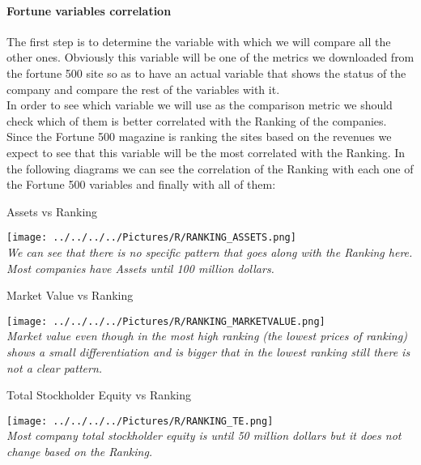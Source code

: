 \documentclass{article}
\begin{document}
\paragraph{Fortune variables correlation}
The first step is to determine the variable with which we will compare all the other ones. Obviously this variable will be one of the metrics we downloaded from the fortune 500 site so as to have an actual variable that shows the status of the company and compare the rest of the variables with it.\\
In order to see which variable we will use as the comparison metric we should check which of them is better correlated with the Ranking of the companies. Since the Fortune 500 magazine is ranking the sites based on the revenues we expect to see that this variable will be the most correlated with the Ranking. In the following diagrams we can see the correlation of the Ranking with each one of the Fortune 500 variables and finally with all of them:\\
\begin{table}[H]
\centering
\caption{Assets vs Ranking}
\begin{center}
\texttt{[image: ../../../../Pictures/R/RANKING\_ASSETS.png]} \\
\textit{We can see that there is no specific pattern that goes along with the Ranking here. Most companies have Assets until 100 million dollars.}
\end{center}
\end{table}

\begin{table}[H]
\centering
\caption{Market Value vs Ranking}
\begin{center}
\texttt{[image: ../../../../Pictures/R/RANKING\_MARKETVALUE.png]}  \\
\textit{Market value even though in the most high ranking (the lowest prices of ranking) shows a small differentiation and is bigger that in the lowest ranking still there is not a clear pattern.}
\end{center}
\end{table}

\begin{table}[H]
\centering
\caption{Total Stockholder Equity  vs Ranking}
\begin{center}
\texttt{[image: ../../../../Pictures/R/RANKING\_TE.png]}  \\
\textit{Most company total stockholder equity is until 50 million dollars but it does not change based on the Ranking.}
\end{center}
\end{table}
\end{document}
